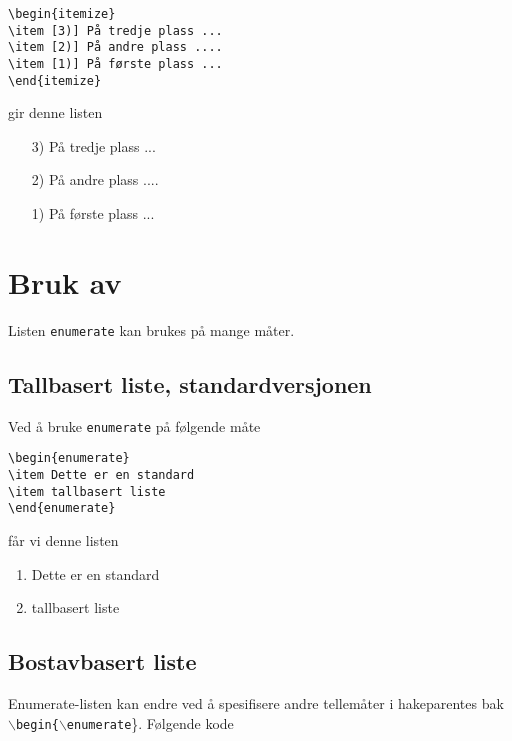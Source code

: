 \begin{boxedminipage}{\textwidth}
\begin{verbatim}
\begin{itemize}
\item [3)] På tredje plass ...
\item [2)] På andre plass ....
\item [1)] På første plass ...
\end{itemize}
\end{verbatim}
\end{boxedminipage}

gir denne listen

\begin{itemize}
\item [3)] På tredje plass ...
\item [2)] På andre plass ....
\item [1)] På første plass ...
\end{itemize}

\newpage

\section{Bruk av }
Listen {\tt enumerate} kan brukes på mange måter.
\subsection{Tallbasert liste, standardversjonen}
Ved å bruke {\tt enumerate} på følgende måte

\begin{boxedminipage}{\textwidth}
\begin{verbatim}
\begin{enumerate}
\item Dette er en standard
\item tallbasert liste
\end{enumerate}
\end{verbatim}
\end{boxedminipage}

får vi  denne listen
\begin{enumerate}
\item Dette er en standard
\item tallbasert liste
\end{enumerate}

\subsection{Bostavbasert liste}
Enumerate-listen kan endre ved å spesifisere 
andre tellemåter i hakeparentes bak {\tt
  $\backslash$begin\{$\backslash$enumerate}\}. Følgende kode

